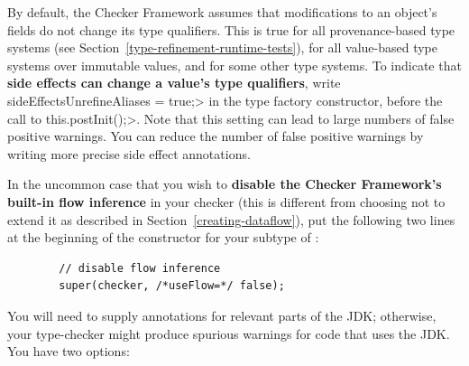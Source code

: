 
By default, the Checker Framework assumes that modifications to an object's
fields do not change its type qualifiers.  This is true for all
provenance-based type systems (see
Section~\ref{type-refinement-runtime-tests}), for all value-based type
systems over immutable values, and for some other type systems.  To
indicate that \textbf{side effects can change a value's type qualifiers},
write \<sideEffectsUnrefineAliases = true;> in the type factory
constructor, before the call to \<this.postInit();>.  Note that this
setting can lead to large numbers of false positive warnings.  You can
reduce the number of false positive warnings by writing more precise side
effect annotations.

In the uncommon case that you wish to \textbf{disable the Checker Framework's
built-in flow inference} in your checker (this is different from choosing
not to extend it as described in Section~\ref{creating-dataflow}), put the
following two lines at the beginning of the constructor for your subtype of
:

\begin{Verbatim}
        // disable flow inference
        super(checker, /*useFlow=*/ false);
\end{Verbatim}



You will need to supply annotations for relevant parts of the JDK;
otherwise, your type-checker might produce spurious warnings for code that
uses the JDK\@.  You have two options:

